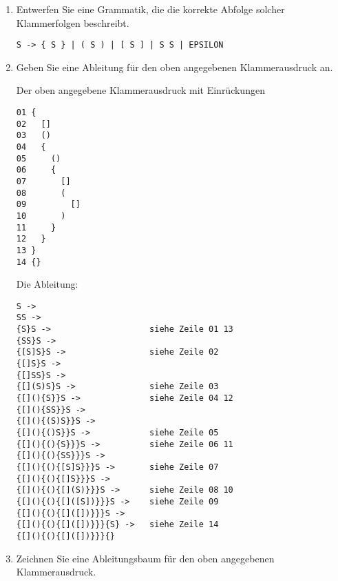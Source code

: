 \documentclass{bschlangaul-aufgabe}
\begin{document}
\begin{enumerate}


\item Entwerfen Sie eine Grammatik, die die korrekte Abfolge solcher
Klammerfolgen beschreibt.

\begin{bAntwort}
\begin{verbatim}
S -> { S } | ( S ) | [ S ] | S S | EPSILON
\end{verbatim}
\end{bAntwort}


\item Geben Sie eine Ableitung für den oben angegebenen Klammerausdruck
an.

\begin{bAntwort}
Der oben angegebene Klammerausdruck mit Einrückungen

\begin{verbatim}
01 {
02   []
03   ()
04   {
05     ()
06     {
07       []
08       (
09         []
10       )
11     }
12   }
13 }
14 {}
\end{verbatim}

Die Ableitung:

\begin{verbatim}
S ->
SS ->
{S}S ->                    siehe Zeile 01 13
{SS}S ->
{[S]S}S ->                 siehe Zeile 02
{[]S}S ->
{[]SS}S ->
{[](S)S}S ->               siehe Zeile 03
{[](){S}}S ->              siehe Zeile 04 12
{[](){SS}}S ->
{[](){(S)S}}S ->
{[](){()S}}S ->            siehe Zeile 05
{[](){(){S}}}S ->          siehe Zeile 06 11
{[](){(){SS}}}S ->
{[](){(){[S]S}}}S ->       siehe Zeile 07
{[](){(){[]S}}}S ->
{[](){(){[](S)}}}S ->      siehe Zeile 08 10
{[](){(){[]([S])}}}S ->    siehe Zeile 09
{[](){(){[]([])}}}S ->
{[](){(){[]([])}}}{S} ->   siehe Zeile 14
{[](){(){[]([])}}}{}
\end{verbatim}
\end{bAntwort}

\newpage

\item Zeichnen Sie eine Ableitungsbaum für den oben angegebenen
Klammerausdruck.


\end{enumerate}
\end{document}

